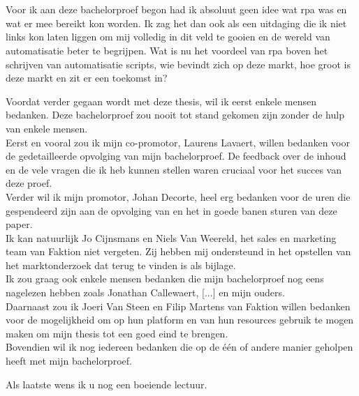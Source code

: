 
\chapter*{}
\label{ch:voorwoord}

Voor ik aan deze bachelorproef begon had ik absoluut geen idee wat \acrlong{rpa} was en wat er mee bereikt kon worden. Ik zag het dan ook als een uitdaging die ik niet links kon laten liggen om mij volledig in dit veld te gooien en de wereld van automatisatie beter te begrijpen. Wat is nu het voordeel van \acrshort{rpa} boven het schrijven van automatisatie scripts, wie bevindt zich op deze markt, hoe groot is deze markt en zit er een toekomst in?

Voordat verder gegaan wordt met deze thesis, wil ik eerst enkele mensen bedanken. Deze bachelorproef zou nooit tot stand gekomen zijn zonder de hulp van enkele mensen.\\
Eerst en vooral zou ik mijn co-promotor, Laurens Lavaert, willen bedanken voor de gedetailleerde
opvolging van mijn bachelorproef. De feedback over de inhoud en de vele vragen die ik heb kunnen stellen waren cruciaal voor het succes van deze proef.\\
Verder wil ik mijn promotor, Johan Decorte, heel erg bedanken voor de uren die
gespendeerd zijn aan de opvolging van en het in goede banen sturen van deze paper.\\
Ik kan natuurlijk Jo Cijnsmans en Niels Van Weereld, het sales en marketing team van Faktion niet vergeten. Zij hebben mij ondersteund in het opstellen van het marktonderzoek dat terug te vinden is als bijlage.\\
Ik zou graag ook enkele mensen bedanken die mijn bachelorproef nog eens nagelezen hebben zoals Jonathan Callewaert, [...] en mijn ouders.\\
Daarnaast zou ik Joeri Van Steen en Filip Martens van Faktion willen bedanken voor de mogelijkheid om op hun platform en van hun resources gebruik te mogen maken om mijn thesis tot een goed eind te brengen. \\
Bovendien wil ik nog iedereen bedanken die op de één of andere manier geholpen heeft met mijn bachelorproef.

Als laatste wens ik u nog een boeiende lectuur.

